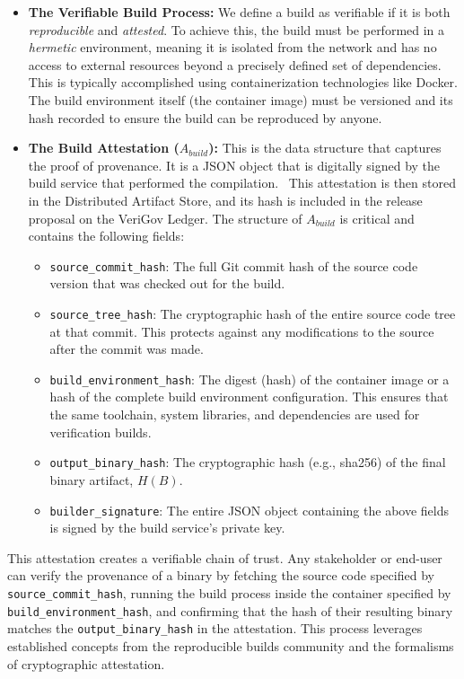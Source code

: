 \documentclass{article}
\begin{document}
\begin{itemize}
\item \textbf{The Verifiable Build Process:} We define a build as verifiable if it is both \emph{reproducible} and \emph{attested}. To achieve this, the build must be performed in a \emph{hermetic} environment, meaning it is isolated from the network and has no access to external resources beyond a precisely defined set of dependencies.~\cite{lamb2022reproducible} This is typically accomplished using containerization technologies like Docker. The build environment itself (the container image) must be versioned and its hash recorded to ensure the build can be reproduced by anyone.
\item \textbf{The Build Attestation (}$A_{build}$\textbf{):} This is the data structure that captures the proof of provenance. It is a JSON object that is digitally signed by the build service that performed the compilation.~\cite{slsa} This attestation is then stored in the Distributed Artifact Store, and its hash is included in the release proposal on the VeriGov Ledger. The structure of $A_{build}$ is critical and contains the following fields:
\begin{itemize}
\item \lstinline{source_commit_hash}: The full Git commit hash of the source code version that was checked out for the build.
\item \lstinline{source_tree_hash}: The cryptographic hash of the entire source code tree at that commit. This protects against any modifications to the source after the commit was made.
\item \lstinline{build_environment_hash}: The digest (hash) of the container image or a hash of the complete build environment configuration. This ensures that the same toolchain, system libraries, and dependencies are used for verification builds.~\cite{lamb2022reproducible}
\item \lstinline{output_binary_hash}: The cryptographic hash (e.g., sha256) of the final binary artifact, $H(B)$.
\item \lstinline{builder_signature}: The entire JSON object containing the above fields is signed by the build service's private key.
\end{itemize}
\end{itemize}

This attestation creates a verifiable chain of trust. Any stakeholder or end-user can verify the provenance of a binary by fetching the source code specified by \lstinline{source_commit_hash}, running the build process inside the container specified by \lstinline{build_environment_hash}, and confirming that the hash of their resulting binary matches the \lstinline{output_binary_hash} in the attestation. This process leverages established concepts from the reproducible builds community and the formalisms of cryptographic attestation.~\cite{lamb2022reproducible}
\end{document}
